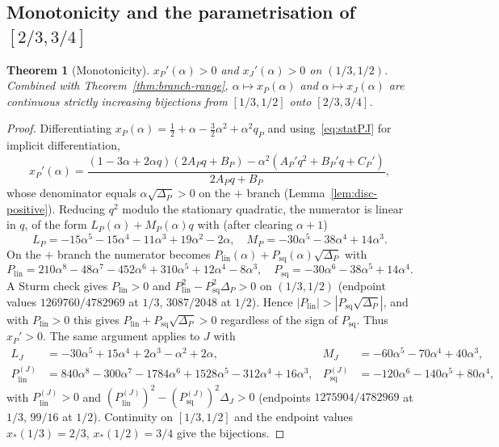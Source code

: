 \documentclass[11pt]{amsart}
\newtheorem{theorem}{Theorem}[section]
\theoremstyle{definition}
\newcommand{\1}{\mathbf 1}
\begin{document}
\subsection{Monotonicity and the parametrisation of $[2/3,3/4]$}
\label{ssec:cert-mono}

\begin{theorem}[Monotonicity]
\label{thm:monotonicity}
$x_P'(\alpha) > 0$ and $x_J'(\alpha) > 0$ on $(1/3,1/2)$.  Combined with
Theorem~\ref{thm:branch-range}, $\alpha\mapsto x_P(\alpha)$ and
$\alpha\mapsto x_J(\alpha)$ are continuous strictly increasing bijections from
$[1/3,1/2]$ onto $[2/3,3/4]$.
\end{theorem}

\begin{proof}
Differentiating $x_P(\alpha)=\tfrac12+\alpha-\tfrac32\alpha^2+\alpha^2 q_P$ and
using~\eqref{eq:statPJ} for implicit differentiation,
\[
   x_P'(\alpha)
   = \frac{(1-3\alpha+2\alpha q)(2A_P q + B_P) - \alpha^2(A_P' q^2 + B_P' q + C_P')}
          {2 A_P q + B_P},
\]
whose denominator equals $\alpha\sqrt{\Delta_P}>0$ on the $+$ branch
(Lemma~\ref{lem:disc-positive}).  Reducing $q^2$ modulo the stationary quadratic,
the numerator is linear in $q$, of the form $L_P(\alpha)+M_P(\alpha)q$ with (after
clearing $\alpha+1$)
\[
L_P = -15\alpha^5 - 15\alpha^4 - 11\alpha^3 + 19\alpha^2 - 2\alpha,
\quad
M_P = -30\alpha^5 - 38\alpha^4 + 14\alpha^3.
\]
On the $+$ branch the numerator becomes
$P_{\mathrm{lin}}(\alpha) + P_{\mathrm{sq}}(\alpha)\sqrt{\Delta_P}$ with
\[
P_{\mathrm{lin}} = 210\alpha^8 - 48\alpha^7 - 452\alpha^6 + 310\alpha^5 + 12\alpha^4 - 8\alpha^3,
\quad
P_{\mathrm{sq}}  = -30\alpha^6 - 38\alpha^5 + 14\alpha^4.
\]
A Sturm check gives $P_{\mathrm{lin}}>0$ and
$P_{\mathrm{lin}}^2 - P_{\mathrm{sq}}^2\Delta_P>0$ on $(1/3,1/2)$ (endpoint
values $1269760/4782969$ at $1/3$, $3087/2048$ at $1/2$).  Hence
$|P_{\mathrm{lin}}|>|P_{\mathrm{sq}}\sqrt{\Delta_P}|$, and with
$P_{\mathrm{lin}}>0$ this gives $P_{\mathrm{lin}}+P_{\mathrm{sq}}\sqrt{\Delta_P}>0$
regardless of the sign of $P_{\mathrm{sq}}$.  Thus $x_P'>0$.  The same argument
applies to $J$ with
\begin{align*}
L_J &= -30\alpha^5+15\alpha^4+2\alpha^3-\alpha^2+2\alpha,
&
M_J &= -60\alpha^5-70\alpha^4+40\alpha^3,
\\
P_{\mathrm{lin}}^{(J)} &= 840\alpha^8 - 300\alpha^7 - 1784\alpha^6 + 1528\alpha^5 - 312\alpha^4 + 16\alpha^3,
&
P_{\mathrm{sq}}^{(J)}  &= -120\alpha^6 - 140\alpha^5 + 80\alpha^4,
\end{align*}
with $P_{\mathrm{lin}}^{(J)}>0$ and
$(P_{\mathrm{lin}}^{(J)})^2-(P_{\mathrm{sq}}^{(J)})^2\Delta_J>0$ (endpoints
$1275904/4782969$ at $1/3$, $99/16$ at $1/2$).  Continuity on $[1/3,1/2]$ and the
endpoint values $x_*(1/3)=2/3$, $x_*(1/2)=3/4$ give the bijections.
\end{proof}
\end{document}
